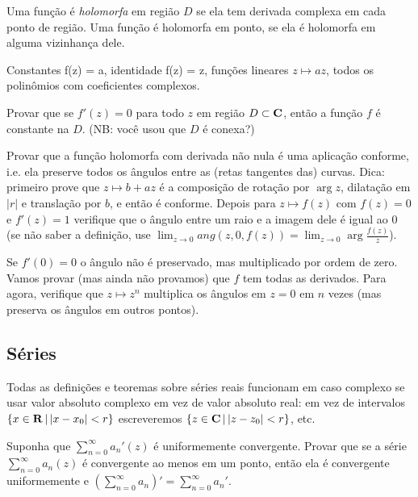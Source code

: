 \begin{defin} Uma função é \emph{holomorfa} em região $D$ se ela tem derivada complexa em cada ponto de região.
Uma função é holomorfa em ponto, se ela é holomorfa em alguma vizinhança dele.
\end{defin}

\begin{exem}
Constantes f(z) = a,
identidade f(z) = z,
funções lineares $z \mapsto a z$,
todos os polinômios com coeficientes complexos.
\end{exem}

\begin{problema}
Provar que se $f'(z)=0$ para todo $z$ em região $D\subset \mathbf{C}$, então a função $f$ é constante na $D$.
(NB: você usou que $D$ é conexa?)
\end{problema}

\begin{problema}
Provar que a função holomorfa com derivada não nula é uma aplicação conforme,
i.e. ela preserve todos os ângulos entre as (retas tangentes das) curvas.
Dica: primeiro prove que $z \mapsto b+ a z$ é a composição de rotação por $\arg z$, dilatação em $|r|$
e translação por $b$, e então é conforme.
Depois para $z \mapsto f(z)$ com $f(z) = 0$ e $f'(z)=1$ verifique que o ângulo entre um raio e a imagem dele
é igual ao $0$ (se não saber a definição, use $\lim_{z\to 0} ang(z,0,f(z)) = \lim_{z\to 0} \arg \frac{f(z)}{z}$).
\end{problema}

Se $f'(0)=0$ o ângulo não é preservado, mas multiplicado por ordem de zero. Vamos provar (mas ainda não provamos) que $f$ tem todas as derivados. Para agora, verifique que $z\mapsto z^n$ multiplica os ângulos em $z=0$ em $n$ vezes
(mas preserva os ângulos em outros pontos).

\subsection{Séries}

Todas as definições e teoremas sobre séries reais funcionam em caso complexo
se usar valor absoluto complexo em vez de valor absoluto real:
em vez de intervalos $\{x\in \mathbf{R}\,|\,|x-x_0|<r\}$ escreveremos $\{z\in \mathbf{C}\,|\,|z-z_0|<r\}$, etc.

\begin{problema}
Suponha que $\sum_{n=0}^\infty a_n'(z)$ é uniformemente convergente.
Provar que se a série $\sum_{n=0}^\infty a_n(z)$ é convergente ao menos em um ponto,
então ela é convergente uniformemente e $(\sum_{n=0}^\infty a_n)' = \sum_{n=0}^\infty a_n'$.
\end{problema}

